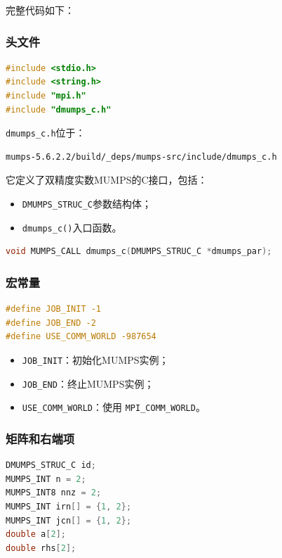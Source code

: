 完整代码如下：

\subsubsection{头文件}

\begin{lstlisting}[language=C]
#include <stdio.h>
#include <string.h>
#include "mpi.h"
#include "dmumps_c.h"
\end{lstlisting}

\texttt{dmumps\_c.h}位于：

\begin{lstlisting}
mumps-5.6.2.2/build/_deps/mumps-src/include/dmumps_c.h
\end{lstlisting}

它定义了双精度实数MUMPS的C接口，包括：

\begin{itemize}
  \item \texttt{DMUMPS\_STRUC\_C}参数结构体；
  \item \texttt{dmumps\_c()}入口函数。
\end{itemize}

\begin{lstlisting}[language=C]
void MUMPS_CALL dmumps_c(DMUMPS_STRUC_C *dmumps_par);
\end{lstlisting}

\subsubsection{宏常量}

\begin{lstlisting}[language=C]
#define JOB_INIT -1
#define JOB_END -2
#define USE_COMM_WORLD -987654
\end{lstlisting}

\begin{itemize}
  \item \texttt{JOB\_INIT}：初始化MUMPS实例；
  \item \texttt{JOB\_END}：终止MUMPS实例；
  \item \texttt{USE\_COMM\_WORLD}：使用 \texttt{MPI\_COMM\_WORLD}。
\end{itemize}

\subsubsection{矩阵和右端项}

\begin{lstlisting}[language=C]
DMUMPS_STRUC_C id;
MUMPS_INT n = 2;
MUMPS_INT8 nnz = 2;
MUMPS_INT irn[] = {1, 2};
MUMPS_INT jcn[] = {1, 2};
double a[2];
double rhs[2];
\end{lstlisting}

